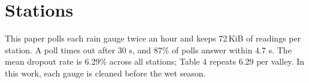 \section{Stations}
This paper polls each rain gauge twice an hour and keeps 72\,KiB of readings per station.
A poll times out after 30 s, and 87\% of polls answer within 4.7 s.
The mean dropout rate is 6.29\% across all stations; Table 4 repeats 6.29 per valley.
In this work, each gauge is cleaned before the wet season.
